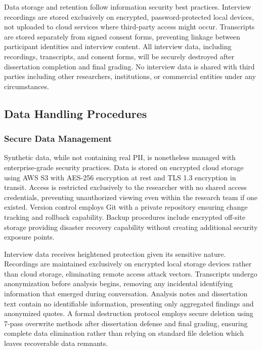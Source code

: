 Data storage and retention follow information security best practices. Interview recordings are stored exclusively on encrypted, password-protected local devices, not uploaded to cloud services where third-party access might occur. Transcripts are stored separately from signed consent forms, preventing linkage between participant identities and interview content. All interview data, including recordings, transcripts, and consent forms, will be securely destroyed after dissertation completion and final grading. No interview data is shared with third parties including other researchers, institutions, or commercial entities under any circumstances.

\subsection{Data Handling Procedures}

\subsubsection{Secure Data Management}

Synthetic data, while not containing real PII, is nonetheless managed with enterprise-grade security practices. Data is stored on encrypted cloud storage using AWS S3 with AES-256 encryption at rest and TLS 1.3 encryption in transit. Access is restricted exclusively to the researcher with no shared access credentials, preventing unauthorized viewing even within the research team if one existed. Version control employs Git with a private repository ensuring change tracking and rollback capability. Backup procedures include encrypted off-site storage providing disaster recovery capability without creating additional security exposure points.

Interview data receives heightened protection given its sensitive nature. Recordings are maintained exclusively on encrypted local storage devices rather than cloud storage, eliminating remote access attack vectors. Transcripts undergo anonymization before analysis begins, removing any incidental identifying information that emerged during conversation. Analysis notes and dissertation text contain no identifiable information, presenting only aggregated findings and anonymized quotes. A formal destruction protocol employs secure deletion using 7-pass overwrite methods after dissertation defense and final grading, ensuring complete data elimination rather than relying on standard file deletion which leaves recoverable data remnants.


